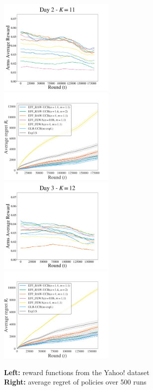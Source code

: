  \begin{figure}[p!]
\caption{\textbf{Left:} reward functions from the Yahoo! dataset \\ \textbf{Right:} average regret of policies over 500 runs}
\label{fig:restless-exp}
\includegraphics[clip, width= 0.495\textwidth]{4Restless/fig/reward_plot_day2.pdf}
\includegraphics[clip, width= 0.495\textwidth]{4Restless/fig/DAY2.pdf}
\includegraphics[clip, width= 0.495\textwidth]{4Restless/fig/reward_plot_day3.pdf}
\includegraphics[clip, width= 0.495\textwidth]{4Restless/fig/DAY3.pdf}

\end{figure}
